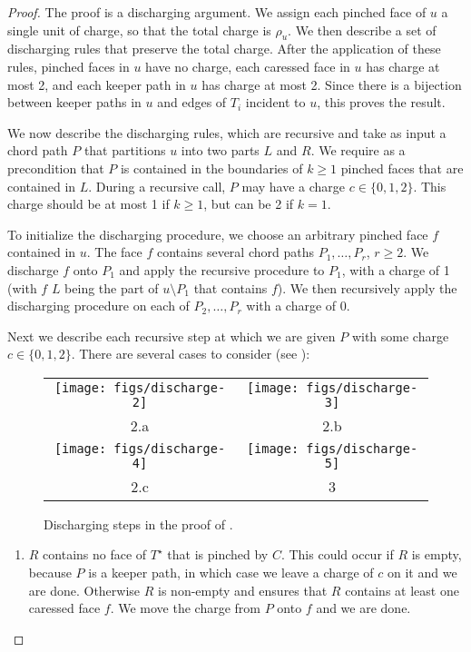\documentclass{patmorin}
\newcommand{\dual}[1]{{#1}^\star}
\begin{document}
\begin{proof}
   The proof is a discharging argument.  We assign each pinched face of
   $u$ a single unit of charge, so that the total charge is $\rho_u$.
   We then describe a set of discharging rules that preserve the total
   charge.  After the application of these rules, pinched faces in $u$
   have no charge, each caressed face in $u$ has charge at most 2,
   and each keeper path in $u$ has charge at most 2.  Since there is a
   bijection between keeper paths in $u$ and edges of $T_i$ incident to
   $u$, this proves the result.

   We now describe the discharging rules, which are recursive and take
   as input a chord path $P$ that partitions $u$ into two parts $L$
   and $R$.  We require as a precondition that $P$ is contained in
   the boundaries of $k\ge 1$ pinched faces that are contained in $L$.
   During a recursive call, $P$ may have a charge $c\in\{0,1,2\}$. This
   charge should be at most 1 if $k\ge 1$, but can be 2 if $k=1$.

   To initialize the discharging procedure, we choose an arbitrary
   pinched face $f$ contained in $u$.  The face $f$ contains several
   chord paths $P_1,\ldots,P_r$, $r\ge 2$.  We discharge $f$ onto $P_1$
   and apply the recursive procedure to $P_1$, with a charge of 1 (with
   $f$ $L$ being the part of $u\setminus P_1$ that contains $f$).  We then
   recursively apply the discharging procedure on each of $P_2,\ldots,P_r$
   with a charge of 0.

   Next we describe each recursive step at which we are given $P$ with
	some charge $c\in\{0,1,2\}$.  There are several cases to consider (see ):
	\begin{figure}
		\begin{center}
		\begin{tabular}{cc}
			\texttt{[image: figs/discharge-2]} &
			\texttt{[image: figs/discharge-3]} \\
			 2.a & 2.b \\[1.5em]
			\texttt{[image: figs/discharge-4]} &
			\texttt{[image: figs/discharge-5]} \\
			 2.c & 3 
		\end{tabular}
		\end{center}
		\caption{Discharging steps in the proof of .}
	\end{figure}
  \begin{enumerate}
     \item $R$ contains no face of $\dual{T}$ that is pinched by $C$.
     This could occur if $R$ is empty, because $P$ is a keeper path,
     in which case we leave a charge of $c$ on it and we are done.
     Otherwise $R$ is non-empty and   ensures that
     $R$ contains at least one caressed face $f$.  We move the charge
     from $P$ onto $f$ and we are done.


\end{enumerate}
\end{proof}
\end{document}
